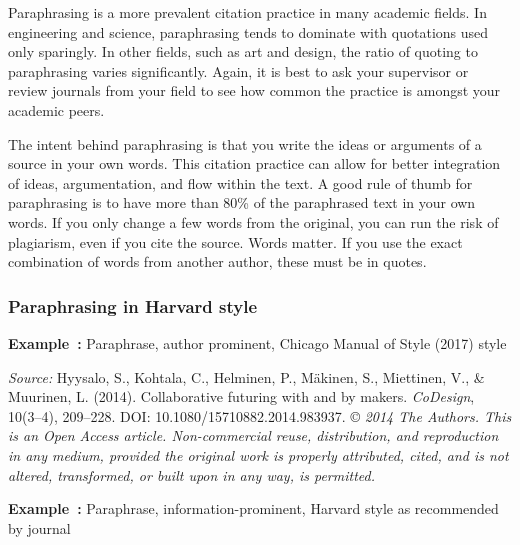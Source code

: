\documentclass[english, 12pt, a4paper, sci, utf8, a-2b, online]{aaltothesis}
\begin{document}
Paraphrasing is a more prevalent citation practice in many academic fields. In 
engineering and science, paraphrasing tends to dominate with quotations used 
only sparingly. In other fields, such as art and design, the ratio of quoting to
paraphrasing varies significantly. Again, it is best to ask your supervisor or 
review journals from your field to see how common the practice is amongst your 
academic peers.

The intent behind paraphrasing is that you write the ideas or arguments of a 
source in your own words. This citation practice can allow for better 
integration of ideas, argumentation, and flow within the text. A good rule of 
thumb for paraphrasing is to have more than 80\% of the paraphrased text in your
own words. If you only change a few words from the original, you can run the 
risk of plagiarism, even if you cite the source. Words matter. If you use the 
exact combination of words from another author, these must be in quotes.


\subsubsection*{Paraphrasing in Harvard style}

\textsf{\textbf{Example~\theexample:}} Paraphrase, author prominent, Chicago 
Manual of Style (2017) style

\vspace{1ex}
\noindent
{}

\vspace{1ex}
\noindent
\textit{Source:} Hyysalo, S., Kohtala, C., Helminen, P., Mäkinen, S., Miettinen,
V., \& Muurinen, L. (2014). Collaborative futuring with and by makers. 
\textit{CoDesign}, 10(3--4), 209--228. DOI: 10.1080/15710882.2014.983937. 
\copyright{}
\textit{2014 The Authors. This is an Open Access article. Non-commercial reuse, 
	distribution, and reproduction in any medium, provided the original work is 
	properly attributed, cited, and is not altered, transformed, or built upon 
	in any way, is permitted.}

\vspace{1em}
\noindent
{}
\textsf{\textbf{Example~\theexample:}} Paraphrase, information-prominent, 
Harvard style as recommended by journal
\end{document}
